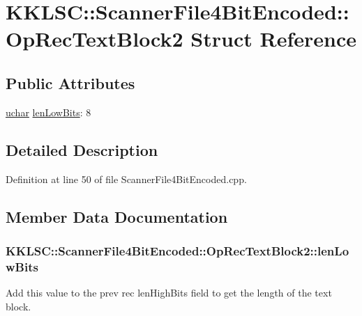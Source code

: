 \hypertarget{struct_scanner_file4_bit_encoded_1_1_op_rec_text_block2}{}\section{K\+K\+L\+SC\+:\+:Scanner\+File4\+Bit\+Encoded\+:\+:Op\+Rec\+Text\+Block2 Struct Reference}
\label{struct_scanner_file4_bit_encoded_1_1_op_rec_text_block2}
\subsection*{Public Attributes}
\begin{DoxyCompactItemize}
\item 
\hyperlink{namespace_k_k_b_ace9969169bf514f9ee6185186949cdf7}{uchar} \hyperlink{struct_scanner_file4_bit_encoded_1_1_op_rec_text_block2_a1f19e0c8c61051f93213e7debed8a15e}{len\+Low\+Bits}\+: 8
\end{DoxyCompactItemize}


\subsection{Detailed Description}


Definition at line 50 of file Scanner\+File4\+Bit\+Encoded.\+cpp.



\subsection{Member Data Documentation}
\subsubsection[{\texorpdfstring{len\+Low\+Bits}{lenLowBits}}]{ K\+K\+L\+S\+C\+::\+Scanner\+File4\+Bit\+Encoded\+::\+Op\+Rec\+Text\+Block2\+::len\+Low\+Bits}\hypertarget{struct_scanner_file4_bit_encoded_1_1_op_rec_text_block2_a1f19e0c8c61051f93213e7debed8a15e}{}\label{struct_scanner_file4_bit_encoded_1_1_op_rec_text_block2_a1f19e0c8c61051f93213e7debed8a15e}
Add this value to the prev rec \textquotesingle{}len\+High\+Bits\textquotesingle{} field to get the length of the text block. 

